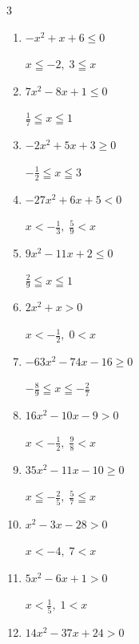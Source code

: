 \begin{multicols}{3}
\begin{enumerate}
        $\displaystyle -\frac{8}{7} < x < \frac{9}{8}$

\columnbreak %

  \item $-x^{2}+x+6\leq 0$

        $\displaystyle x \leqq -2 , \; 3 \leqq x$

  \item $7x^{2}-8x+1\leq 0$

        $\displaystyle \frac{1}{7} \leqq x \leqq 1$

  \item $-2x^{2}+5x+3\geq 0$

        $\displaystyle -\frac{1}{2} \leqq x \leqq 3$

  \item $-27x^{2}+6x+5<0$

        $\displaystyle x < -\frac{1}{3} , \; \frac{5}{9} < x$

  \item $9x^{2}-11x+2\leq 0$

        $\displaystyle \frac{2}{9} \leqq x \leqq 1$

  \item $2x^{2}+x>0$

        $\displaystyle x < -\frac{1}{2} , \; 0 < x$

  \item $-63x^{2}-74x-16\geq 0$

        $\displaystyle -\frac{8}{9} \leqq x \leqq -\frac{2}{7}$

  \item $16x^{2}-10x-9>0$

        $\displaystyle x < -\frac{1}{2} , \; \frac{9}{8} < x$

  \item $35x^{2}-11x-10\geq 0$

        $\displaystyle x \leqq -\frac{2}{5} , \; \frac{5}{7} \leqq x$

  \item $x^{2}-3x-28>0$

        $\displaystyle x < -4 , \; 7 < x$

\columnbreak %

\resetques

  \item $5x^{2}-6x+1>0$

        $\displaystyle x < \frac{1}{5} , \; 1 < x$

  \item $14x^{2}-37x+24>0$


\end{enumerate}
\end{multicols}
